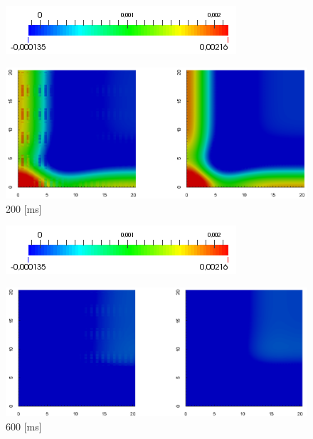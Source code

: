\documentclass[11pt,spanish]{beamer}
\begin{document}
\begin{frame}
\begin{figure}[H]
\centering
\includegraphics[height = 0.9 cm]{fig/numerical_example_MDE_exp3_colourbar}
\end{figure}
\begin{figure}[H]
\centering
\includegraphics[height = 5 cm]{fig/numerical_example_MDE_exp3_200ms}
\caption{200 [ms]}
\end{figure}
\end{frame}

\begin{frame}
\begin{figure}[H]
\centering
\includegraphics[height = 0.9 cm]{fig/numerical_example_MDE_exp3_colourbar}
\end{figure}
\begin{figure}[H]
\centering
\includegraphics[height = 5 cm]{fig/numerical_example_MDE_exp3_600ms}
\caption{600 [ms]}
\end{figure}
\end{frame}
\end{document}
